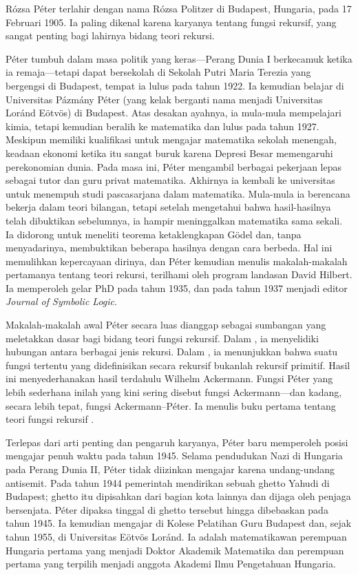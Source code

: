 \documentclass[../../../include/open-logic-section]{subfiles}
\begin{document}



R\'ozsa P\'eter terlahir dengan nama R\'ozsa Politzer di Budapest,
Hungaria, pada 17 Februari 1905. Ia paling dikenal karena karyanya tentang
fungsi rekursif, yang sangat penting bagi lahirnya bidang teori rekursi.

P\'eter tumbuh dalam masa politik yang keras---Perang Dunia I berkecamuk
ketika ia remaja---tetapi dapat bersekolah di Sekolah Putri Maria Terezia
yang bergengsi di Budapest, tempat ia lulus pada tahun 1922. Ia kemudian
belajar di Universitas P\'azm\'any P\'eter (yang kelak berganti nama menjadi
Universitas Lor\'and E\"otv\"os) di Budapest. Atas desakan ayahnya, ia
mula-mula mempelajari kimia, tetapi kemudian beralih ke matematika dan lulus
pada tahun 1927. Meskipun memiliki kualifikasi untuk mengajar matematika
sekolah menengah, keadaan ekonomi ketika itu sangat buruk karena Depresi
Besar memengaruhi perekonomian dunia. Pada masa ini, P\'eter mengambil
berbagai pekerjaan lepas sebagai tutor dan guru privat matematika. Akhirnya
ia kembali ke universitas untuk menempuh studi pascasarjana dalam
matematika. Mula-mula ia berencana bekerja dalam teori bilangan, tetapi
setelah mengetahui bahwa hasil-hasilnya telah dibuktikan sebelumnya, ia
hampir meninggalkan matematika sama sekali. Ia didorong untuk meneliti
teorema ketaklengkapan G\"odel dan, tanpa menyadarinya, membuktikan beberapa
hasilnya dengan cara berbeda. Hal ini memulihkan kepercayaan dirinya,
dan P\'eter kemudian menulis makalah-makalah pertamanya tentang teori
rekursi, terilhami oleh program landasan David Hilbert. Ia memperoleh gelar
PhD pada tahun 1935, dan pada tahun 1937 menjadi editor \emph{Journal of
  Symbolic Logic}.

Makalah-makalah awal P\'eter secara luas dianggap sebagai sumbangan yang
meletakkan dasar bagi bidang teori fungsi rekursif. Dalam \cite{Peter1935a},
ia menyelidiki hubungan antara berbagai jenis rekursi. Dalam
\cite{Peter1935b}, ia menunjukkan bahwa suatu fungsi tertentu yang
didefinisikan secara rekursif bukanlah rekursif primitif. Hasil ini
menyederhanakan hasil terdahulu Wilhelm Ackermann. Fungsi P\'eter yang lebih
sederhana inilah yang kini sering disebut fungsi Ackermann---dan kadang,
secara lebih tepat, fungsi Ackermann--P\'eter. Ia menulis buku pertama
tentang teori fungsi rekursif \citep{Peter1951}.

Terlepas dari arti penting dan pengaruh karyanya, P\'eter baru memperoleh
posisi mengajar penuh waktu pada tahun 1945. Selama pendudukan Nazi di
Hungaria pada Perang Dunia II, P\'eter tidak diizinkan mengajar karena
undang-undang antisemit. Pada tahun 1944 pemerintah mendirikan sebuah ghetto
Yahudi di Budapest; ghetto itu dipisahkan dari bagian kota lainnya dan
dijaga oleh penjaga bersenjata. P\'eter dipaksa tinggal di ghetto tersebut
hingga dibebaskan pada tahun 1945. Ia kemudian mengajar di Kolese Pelatihan
Guru Budapest dan, sejak tahun 1955, di Universitas E\"otv\"os Lor\'and. Ia
adalah matematikawan perempuan Hungaria pertama yang menjadi Doktor Akademik
Matematika dan perempuan pertama yang terpilih menjadi anggota Akademi Ilmu
Pengetahuan Hungaria.
\end{document}
